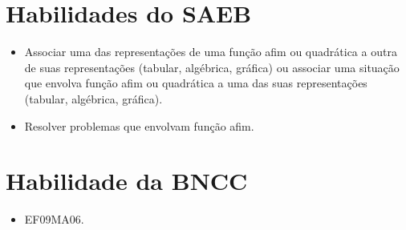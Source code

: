 \section*{Habilidades do SAEB}

\begin{itemize}
  \item Associar uma das representações de uma função afim ou quadrática a
outra de suas representações (tabular, algébrica, gráfica) ou associar uma
situação que envolva função afim ou quadrática a uma das suas
representações (tabular, algébrica, gráfica).
  \item Resolver problemas que envolvam função afim.  
\end{itemize} 

\section*{Habilidade da BNCC}

\begin{itemize}
  \item EF09MA06.
\end{itemize}

